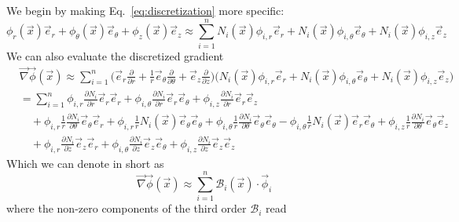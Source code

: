 \documentclass[times,namecite]{goose-article}
\begin{document}
We begin by making Eq.~\eqref{eq:discretization} more specific:
\begin{equation}
  \phi_r (\vec{x}) \vec{e}_r + \phi_\theta (\vec{x}) \vec{e}_\theta + \phi_z (\vec{x}) \vec{e}_z
  \approx
  \sum\limits_{i=1}^{n}
  N_i (\vec{x}) \phi_{i,r}       \vec{e}_r      +
  N_i (\vec{x}) \phi_{i,\theta}  \vec{e}_\theta +
  N_i (\vec{x}) \phi_{i,z}       \vec{e}_z
\end{equation}
We can also evaluate the discretized gradient
\begin{align}
  &\vec{\nabla} \vec{\phi} (\vec{x})
  \approx
  \sum\limits_{i=1}^{n}
  \bigg(
  \vec{e}_r \frac{\partial}{\partial r} +
  \frac{1}{r} \vec{e}_\theta \frac{\partial}{\partial \theta} +
  \vec{e}_z \frac{\partial}{\partial z}
  \bigg)
  \bigg(
  N_i (\vec{x}) \phi_{i,r}       \vec{e}_r      +
  N_i (\vec{x}) \phi_{i,\theta}  \vec{e}_\theta +
  N_i (\vec{x}) \phi_{i,z}       \vec{e}_z
  \bigg)
  \\
  &=
  \sum\limits_{i=1}^{n}
    \phi_{i,r     } \frac{\partial N_i}{\partial r} \vec{e}_r \vec{e}_r
  + \phi_{i,\theta} \frac{\partial N_i}{\partial r} \vec{e}_r \vec{e}_\theta
  + \phi_{i,z     } \frac{\partial N_i}{\partial r} \vec{e}_r \vec{e}_z
  \nonumber
  \\
  &\quad
  + \phi_{i,r     } \frac{1}{r} \frac{\partial N_i }{\partial \theta} \vec{e}_\theta \vec{e}_r
  + \phi_{i,r     } \frac{1}{r} N_i (\vec{x}) \vec{e}_\theta \vec{e}_\theta
  + \phi_{i,\theta} \frac{1}{r} \frac{\partial N_i }{\partial \theta} \vec{e}_\theta \vec{e}_\theta
  - \phi_{i,\theta} \frac{1}{r} N_i (\vec{x}) \vec{e}_r \vec{e}_\theta
  + \phi_{i,z     } \frac{1}{r} \frac{\partial N_i }{\partial \theta} \vec{e}_\theta \vec{e}_z
  \nonumber
  \\
  &\quad
  + \phi_{i,r     } \frac{\partial N_i }{\partial z} \vec{e}_z \vec{e}_r
  + \phi_{i,\theta} \frac{\partial N_i }{\partial z} \vec{e}_z \vec{e}_\theta
  + \phi_{i,z     } \frac{\partial N_i }{\partial z} \vec{e}_z \vec{e}_z
\end{align}
Which we can denote in short as
\begin{equation}
  \vec{\nabla} \vec{\phi} (\vec{x})
  \approx
  \sum\limits_{i=1}^{n}
  \mathcal{B}_i (\vec{x}) \cdot \vec{\phi}_i
\end{equation}
where the non-zero components of the third order $\mathcal{B}_i$ read
\end{document}
